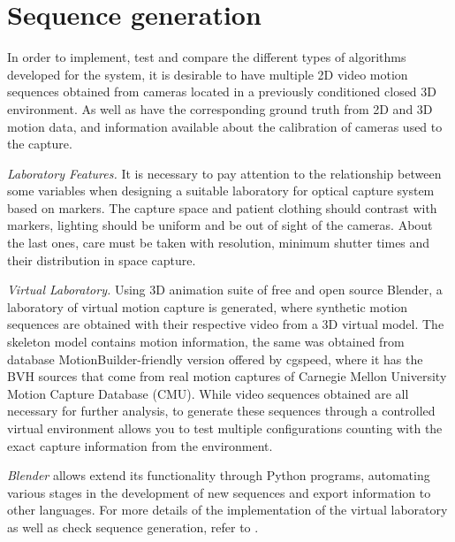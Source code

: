 \section{Sequence generation} 
\label{section_base_de_datos}
In order to implement, test and compare the different types of algorithms developed for the system, it is desirable to have multiple 2D video motion sequences obtained from cameras located in a previously conditioned closed 3D environment. As well as have the corresponding ground truth from 2D and 3D motion data, and information available about the calibration of cameras used to the capture.

\textit{Laboratory Features.}
\label{seccion_Caracteristicas_Laboratorio}
It is necessary to pay attention to the relationship between some variables when designing a suitable laboratory for optical capture system based on markers. The capture space and patient clothing should contrast with markers, lighting should be uniform and be out of sight of the cameras. About the last ones, care must be taken with resolution, minimum shutter times and their distribution in space capture.

\textit{Virtual Laboratory.} Using 3D animation suite of free and open source Blender, a laboratory of virtual motion capture is generated, where synthetic motion sequences are obtained with their respective video from a 3D virtual model.
The skeleton model contains motion information, the same was obtained from database MotionBuilder-friendly version offered by cgspeed, where it has the BVH sources that come from real motion captures of Carnegie Mellon University Motion Capture Database (CMU). While video sequences obtained are all necessary for further analysis, to generate these sequences through a controlled virtual environment allows you to test multiple configurations counting with the exact capture information from the environment.

\emph{Blender} allows extend its functionality through Python programs, automating various stages in the development of new sequences and export information to other languages.
For more details of the implementation of the virtual laboratory as well as check sequence generation, refer to \cite{proyecto_biomecanica}.
